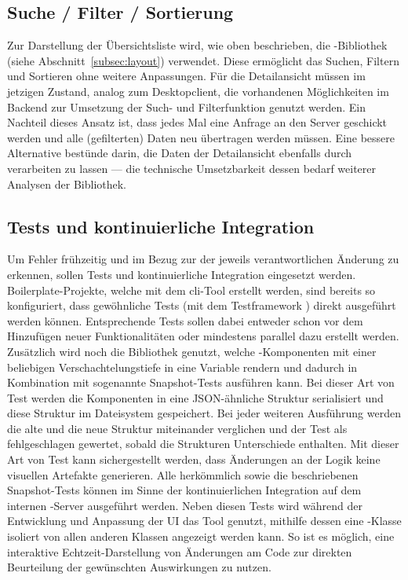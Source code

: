 \subsection{Suche / Filter / Sortierung}
Zur Darstellung der Übersichtsliste wird, wie oben beschrieben, die -Bibliothek  (siehe Abschnitt~\ref{subsec:layout}) verwendet. Diese ermöglicht das Suchen, Filtern und Sortieren ohne weitere Anpassungen. Für die Detailansicht müssen im jetzigen Zustand, analog zum Desktopclient, die vorhandenen Möglichkeiten im Backend zur Umsetzung der Such- und Filterfunktion genutzt werden. Ein Nachteil dieses Ansatz ist, dass jedes Mal eine Anfrage an den Server geschickt werden und alle (gefilterten) Daten neu übertragen werden müssen. Eine bessere Alternative bestünde darin, die Daten der Detailansicht ebenfalls durch  verarbeiten zu lassen --- die technische Umsetzbarkeit dessen bedarf weiterer Analysen der Bibliothek.

\subsection{Tests und kontinuierliche Integration}\label{subsec:test_ci_concept}
Um Fehler frühzeitig und im Bezug zur der jeweils verantwortlichen Änderung zu erkennen, sollen Tests und kontinuierliche Integration eingesetzt werden. Boilerplate-Projekte, welche mit dem \gls{cli}-Tool  erstellt werden, sind bereits so konfiguriert, dass gewöhnliche Tests (mit dem Testframework ) direkt ausgeführt werden können. Entsprechende Tests sollen dabei entweder schon vor dem Hinzufügen neuer Funktionalitäten oder mindestens parallel dazu erstellt werden. Zusätzlich wird noch die Bibliothek  genutzt, welche -Komponenten mit einer beliebigen Verschachtelungstiefe in eine Variable rendern und dadurch in Kombination mit  sogenannte Snapshot-Tests ausführen kann. Bei dieser Art von Test werden die Komponenten in eine JSON-ähnliche Struktur serialisiert und diese Struktur im Dateisystem gespeichert. Bei jeder weiteren Ausführung werden die alte und die neue Struktur miteinander verglichen und der Test als fehlgeschlagen gewertet, sobald die Strukturen Unterschiede enthalten. Mit dieser Art von Test kann sichergestellt werden, dass Änderungen an der Logik keine visuellen Artefakte generieren. Alle herkömmlich sowie die beschriebenen Snapshot-Tests können im Sinne der kontinuierlichen Integration auf dem internen -Server ausgeführt werden.
Neben diesen Tests wird während der Entwicklung und Anpassung der UI das Tool  genutzt, mithilfe dessen eine -Klasse isoliert von allen anderen Klassen angezeigt werden kann. So ist es möglich, eine interaktive Echtzeit-Darstellung von Änderungen am Code zur direkten Beurteilung der gewünschten Auswirkungen zu nutzen.

